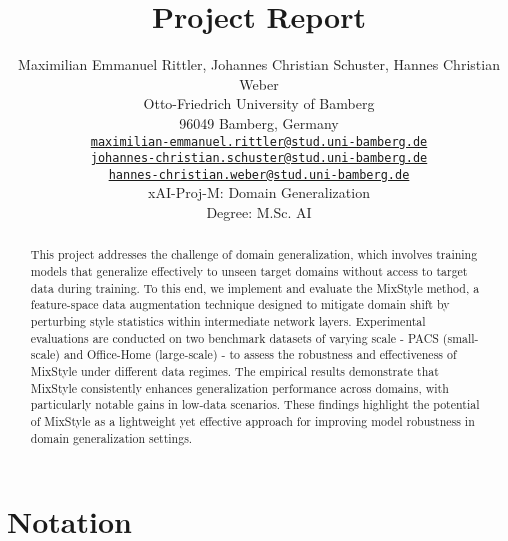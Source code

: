 \documentclass[a4paper]{article}
\title{Project Report}
\author{%
 Maximilian Emmanuel Rittler, Johannes Christian Schuster, Hannes Christian Weber %
    \\
  Otto-Friedrich University of Bamberg\\
  96049 Bamberg, Germany\\
  \href{mailto:maximilian-emmanuel.rittler@stud.uni-bamberg.de}{\texttt{maximilian-emmanuel.rittler@stud.uni-bamberg.de}} \\
  \href{mailto:johannes-christian.schuster@stud.uni-bamberg.de}{\texttt{johannes-christian.schuster@stud.uni-bamberg.de}}
   \\
   \href{mailto:hannes-christian.weber@stud.uni-bamberg.de}{\texttt{hannes-christian.weber@stud.uni-bamberg.de}}\\[0.5cm]
  xAI-Proj-M: Domain Generalization \\
  Degree: M.Sc. AI
}
\begin{document}
\maketitle
\def\va{{\bm{a}}}

\begin{abstract}
	This project addresses the challenge of domain generalization, which involves training models that generalize effectively to unseen target domains without access to target data during training. To this end, we implement and evaluate the MixStyle method, a feature-space data augmentation technique designed to mitigate domain shift by perturbing style statistics within intermediate network layers. Experimental evaluations are conducted on two benchmark datasets of varying scale - PACS (small-scale) and Office-Home (large-scale) - to assess the robustness and effectiveness of MixStyle under different data regimes. The empirical results demonstrate that MixStyle consistently enhances generalization performance across domains, with particularly notable gains in low-data scenarios. These findings highlight the potential of MixStyle as a lightweight yet effective approach for improving model robustness in domain generalization settings.
\end{abstract}
\clearpage










\section{Notation}


\medskip







\end{document}
